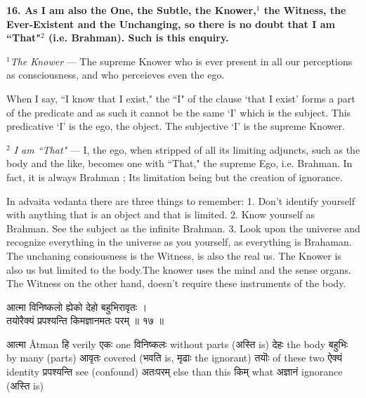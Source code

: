 \documentclass{article}
\begin{document}
\bigskip

\textbf{ 16. As I am also the One, the Subtle, the Knower,$^1$ the Witness, the
Ever-Existent and the Unchanging, so there is no doubt that I am ``That"$^2$
(i.e. Brahman). Such is this enquiry.  }

{\small \textit{$^1$The Knower} --- The supreme Knower who is ever present in
all our perceptions as consciousness, and who perceieves even the ego.

When I say, ``I know that I exist," the ``I" of the clause `that I exist' forms
a part of the predicate and as such it cannot be the same `I' which is the
subject. This predicative `I' is the ego, the object. The subjective `I' is the
supreme Knower.

\textit{$^2$ I am ``That"} --- I, the ego, when stripped of all its limiting
adjuncts, such as the body and the like, becomes one with ``That," the supreme
Ego, i.e. Brahman. In fact, it is always Brahman ; Its limitation being but the
creation of ignorance.  }

\begin{oframed}

    In advaita vedanta there are three things to remember: 1. Don't identify
    yourself with anything that is an object and that is limited. 2.  Know
    yourself as Brahman. See the subject as the infinite Brahman. 3. Look upon
    the universe and recognize everything in the universe as you yourself, as
    everything is Brahaman.  The unchaning consiousness is the Witness, is also
    the real us. The Knower is also us but limited to the body.The knower uses
    the mind and the sense organs. The Witness on the other hand, doesn't
    require these instruments of the body.

\end{oframed}

\begin{large}
\begin{center}
    \begin{hindi}

आत्मा विनिष्कलो ह्येको देहो बहुभिरावृतः ।\\
तयोरैक्यं प्रपश्यन्ति किमज्ञानमतः परम् ॥ १७ ॥
    \end{hindi}
\end{center}
\end{large}

\texthindi{आत्मा}
Âtman
\texthindi{हि}
verily
\texthindi{एकः}
one
\texthindi{विनिष्कलः}
without parts
(\texthindi{अस्ति}
is)
\texthindi{देहः}
the body
\texthindi{बहुभिः}
by many (parts)
\texthindi{आवृतः}
covered
(\texthindi{भवति}
is,
\texthindi{मृढाः}
the ignorant)
\texthindi{तयॊः}
of these two
\texthindi{ऐक्यं}
identity
\texthindi{प्रपश्यन्ति}
see (confound)
\texthindi{अतःपरम्}
else than this
\texthindi{किम्}
what
\texthindi{अज्ञानं}
ignorance
(\texthindi{अस्ति}
is)
\end{document}
